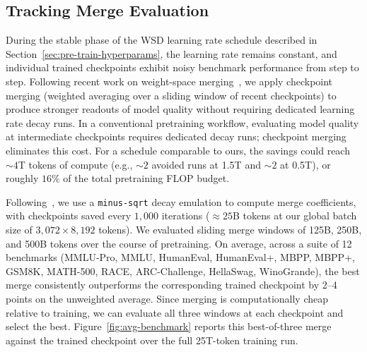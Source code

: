 
\subsection{Tracking Merge Evaluation}\label{sec:pre-train-merge-eval}

During the stable phase of the WSD learning rate schedule described in Section~\ref{sec:pre-train-hyperparams}, the learning rate remains constant, and individual trained checkpoints exhibit noisy benchmark performance from step to step. Following recent work on weight-space merging~\citep{wortsman2022modelsoup,tian2025wsm,ling2025foundation}, we apply checkpoint merging (weighted averaging over a sliding window of recent checkpoints) to produce stronger readouts of model quality without requiring dedicated learning rate decay runs. In a conventional pretraining workflow, evaluating model quality at intermediate checkpoints requires dedicated decay runs; checkpoint merging eliminates this cost. For a schedule comparable to ours, the savings could reach ${\sim}4$T tokens of compute (e.g., ${\sim}2$ avoided runs at 1.5T and ${\sim}2$ at 0.5T), or roughly $16\%$ of the total pretraining FLOP budget.

Following~\citet{tian2025wsm}, we use a \texttt{minus-sqrt} decay emulation to compute merge coefficients, with checkpoints saved every $1{,}000$ iterations (${\approx}25$B tokens at our global batch size of $3{,}072 \times 8{,}192$ tokens). We evaluated sliding merge windows of 125B, 250B, and 500B tokens over the course of pretraining. On average, across a suite of 12 benchmarks (MMLU-Pro, MMLU, HumanEval, HumanEval+, MBPP, MBPP+, GSM8K, MATH-500, RACE, ARC-Challenge, HellaSwag, WinoGrande), the best merge consistently outperforms the corresponding trained checkpoint by 2--4 points on the unweighted average. Since merging is computationally cheap relative to training, we can evaluate all three windows at each checkpoint and select the best. Figure~\ref{fig:avg-benchmark} reports this best-of-three merge against the trained checkpoint over the full 25T-token training run.

